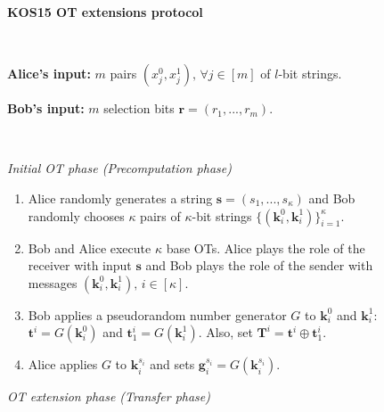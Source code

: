 \begin{figure}
    \centering
        \begin{tcolorbox}
                        
			\centerline{\textbf{KOS15 OT extensions protocol \citep{KOS15}}}
            
			\ 

    \textbf{Alice's input:} $m$ pairs $(x^0_j, x^1_j),\, \forall j\in[m]$ of $l$-bit strings.
    
    \textbf{Bob's input:} $m$ selection bits $\boldsymbol{r} = (r_1, ..., r_m)$.
    
    \
    
    \textit{Initial OT phase (Precomputation phase)}
    \begin{enumerate}
         \item Alice randomly generates a string $\boldsymbol{s} = (s_1, ..., s_\kappa)$ and Bob randomly chooses $\kappa$ pairs of $\kappa$-bit strings $\{(\boldsymbol{k}^0_i, \boldsymbol{k}^1_i)\}^\kappa_{i=1}$.
         \item Bob and Alice execute $\kappa$ base OTs. Alice plays the role of the receiver with input $\boldsymbol{s}$ and Bob plays the role of the sender with messages $(\boldsymbol{k}^0_i, \boldsymbol{k}^1_i),\, i\in[\kappa]$.
         \item Bob applies a pseudorandom number generator $G$ to $\boldsymbol{k}^0_i$ and $\boldsymbol{k}^1_i$: $\boldsymbol{t}^i = G(\boldsymbol{k}^0_i)$ and $\boldsymbol{t}^i_1 = G(\boldsymbol{k}^1_i)$. Also, set $\boldsymbol{T}^i = \boldsymbol{t}^i \oplus \boldsymbol{t}^i_1$.
         \item Alice applies $G$ to $\boldsymbol{k}^{s_i}_i$ and sets $\boldsymbol{g}^{s_i}_i = G(\boldsymbol{k}^{s_i}_i)$.
    \end{enumerate}
    \textit{OT extension phase (Transfer phase)}
    

\end{tcolorbox}
\end{figure}
